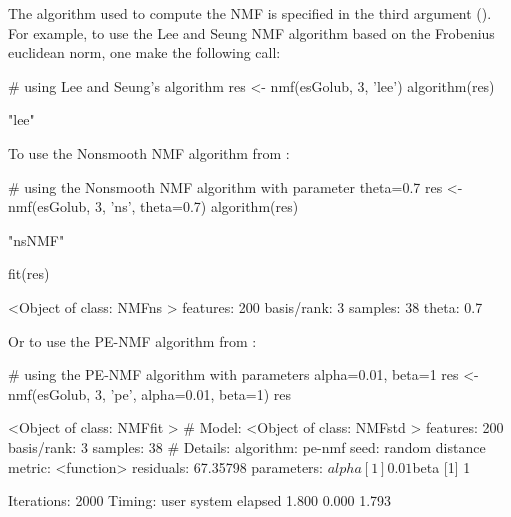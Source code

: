 \documentclass[a4paper]{article}
\begin{document}

The algorithm used to compute the NMF is specified in the third argument (). 
For example, to use the Lee and Seung \cite{Lee2000} NMF algorithm based on the 
Frobenius euclidean norm, one make the following call: 
\begin{Schunk}
\begin{Sinput}
 # using Lee and Seung's algorithm
 res <- nmf(esGolub, 3, 'lee')
 algorithm(res)
\end{Sinput}
\begin{Soutput}
[1] "lee"
\end{Soutput}
\end{Schunk}

To use the Nonsmooth NMF algorithm from \cite{nsNMF2006}: 
\begin{Schunk}
\begin{Sinput}
 # using the Nonsmooth NMF algorithm with parameter theta=0.7
 res <- nmf(esGolub, 3, 'ns', theta=0.7)
 algorithm(res)
\end{Sinput}
\begin{Soutput}
[1] "nsNMF"
\end{Soutput}
\begin{Sinput}
 fit(res)
\end{Sinput}
\begin{Soutput}
<Object of class: NMFns >
features: 200 
basis/rank: 3 
samples: 38 
theta: 0.7 
\end{Soutput}
\end{Schunk}

Or to use the PE-NMF algorithm from \cite{Zhang2008}:
\begin{Schunk}
\begin{Sinput}
 # using the PE-NMF algorithm with parameters alpha=0.01, beta=1
 res <- nmf(esGolub, 3, 'pe', alpha=0.01, beta=1)
 res
\end{Sinput}
\begin{Soutput}
<Object of class: NMFfit >
 # Model:
  <Object of class: NMFstd >
  features: 200 
  basis/rank: 3 
  samples: 38 
 # Details:
  algorithm:  pe-nmf 
  seed:  random 
  distance metric:  <function> 
  residuals:  67.35798 
  parameters:
  $alpha
  [1] 0.01
  
  $beta
  [1] 1
  
  Iterations: 2000 
  Timing:
     user  system elapsed 
    1.800   0.000   1.793 
\end{Soutput}
\end{Schunk}
\end{document}
